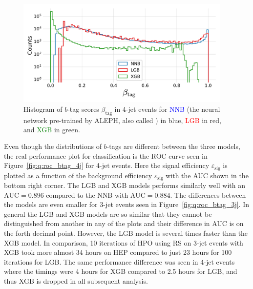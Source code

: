 \begin{figure}[h!]
  \centerfloat
  \includegraphics[width=0.95\textwidth, trim=0 0 0 30, clip]{figures/quarks/y_pred_4_jet_hist-down_sample=1.00-ML_vars=vertex-selection=b-ejet_min=4-n_iter_RS_lgb=99-n_iter_RS_xgb=9-cdot_cut=0.90-version=19.pdf}
  \caption[$b$-Tag Scores in 4-Jet Events]
          {Histogram of $b$-tag scores $\beta_\mathrm{tag}$ in 4-jet events for \textcolor{blue}{NNB} (the neural network pre-trained by ALEPH, also called ) in blue, \textcolor{red}{LGB} in red, and \textcolor{green}{XGB} in green. 
          } 
  \label{fig:q:btag_scores_4j}
\end{figure}

Even though the distributions of $b$-tags are different between the three models, the real performance plot for classification is the ROC curve seen in Figure~\ref{fig:q:roc_btag_4j} for 4-jet events. Here the signal efficiency $\varepsilon_\mathrm{sig}$ is plotted as a function of the background efficiency $\varepsilon_\mathrm{sig}$ with the AUC shown in the bottom right corner. The LGB and XGB models performs similarly well with an $\mathrm{AUC}=0.896$ compared to the NNB with $\mathrm{AUC}=0.884$. The differences between the models are even smaller for 3-jet events seen in Figure~\ref{fig:q:roc_btag_3j}. In general the LGB and XGB models are so similar that they cannot be distinguished from another in any of the plots and their difference in AUC is on the forth decimal point. \label{page:q:timings_b_tag}
However, the LGB model is several times faster than the XGB model. In comparison, \num{10} iterations of HPO using RS on 3-jet events with XGB took more almost \num{34} hours on HEP compared to just \num{23} hours for \num{100} iterations for LGB. The same performance difference was seen in 4-jet events where the timings were \num{4} hours for XGB compared to \num{2.5} hours for LGB, and thus XGB is dropped in all subsequent analysis. 

